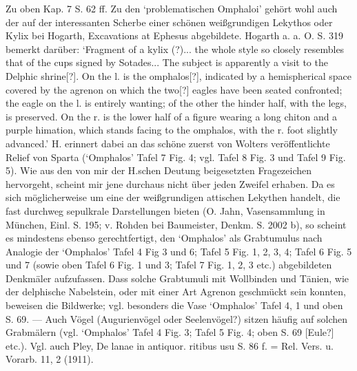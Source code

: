 \documentclass[a4paper, 11pt, oneside]{article}
\begin{document}
Zu oben Kap. 7 S. 62 ff. Zu den `problematischen Omphaloi' gehört wohl auch der auf der interessanten Scherbe einer schönen weißgrundigen Lekythos oder Kylix bei Hogarth, Excavations at Ephesus abgebildete. Hogarth a. a. O. S. 319 bemerkt darüber: `Fragment of a kylix (?)... the whole style so closely resembles that of the cups signed by Sotades... The subject is apparently a visit to the Delphic shrine[?]. On the l. is the omphalos[?], indicated by a hemispherical space covered by the agrenon on which the two[?] eagles have been seated confronted; the eagle on the l. is entirely wanting; of the other the hinder half, with the legs, is preserved. On the r. is the lower half of a figure wearing a long chiton and a purple himation, which stands facing to the omphalos, with the r. foot slightly advanced.' H. erinnert dabei an das schöne zuerst von Wolters veröffentlichte Relief von Sparta (`Omphalos' Tafel 7 Fig. 4; vgl. Tafel 8 Fig. 3 und Tafel 9 Fig. 5). Wie aus den von mir der H.schen Deutung beigesetzten Fragezeichen hervorgeht, scheint mir jene durchaus nicht über jeden Zweifel erhaben. Da es sich möglicherweise um eine der weißgrundigen attischen Lekythen handelt, die fast durchweg sepulkrale Darstellungen bieten (O. Jahn, Vasensammlung in München, Einl. S. 195; v. Rohden bei Baumeister, Denkm. S. 2002 b), so scheint es mindestens ebenso gerechtfertigt, den `Omphalos' als Grabtumulus nach Analogie der `Omphalos' Tafel 4 Fig 3 und 6; Tafel 5 Fig. 1, 2, 3, 4; Tafel 6 Fig. 5 und 7 (sowie oben Tafel 6 Fig. 1 und 3; Tafel 7 Fig. 1, 2, 3 etc.) abgebildeten Denkmäler aufzufassen. Dass solche Grabtumuli mit Wollbinden und Tänien, wie der delphische Nabelstein, oder mit einer Art Agrenon geschmückt sein konnten, beweisen die Bildwerke; vgl. besonders die Vase `Omphalos' Tafel 4, 1 und oben S. 69. --- Auch Vögel (Augurienvögel oder Seelenvögel?) sitzen häufig auf solchen Grabmälern (vgl. `Omphalos' Tafel 4 Fig. 3; Tafel 5 Fig. 4; oben S. 69 [Eule?] etc.). Vgl. auch Pley, De lanae in antiquor. ritibus usu S. 86 f. = Rel. Vers. u. Vorarb. 11, 2 (1911).
\end{document}
